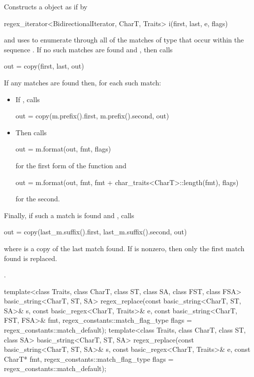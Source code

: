 \begin{itemdescr}
\pnum
{}%
%
\effects
Constructs a  object 
as if by
\begin{codeblock}
regex_iterator<BidirectionalIterator, CharT, Traits> i(first, last, e, flags)
\end{codeblock}
and uses  to enumerate through all
of the matches  of type 
that occur within the sequence .
If no such
matches are found and
, then calls
\begin{codeblock}
out = copy(first, last, out)
\end{codeblock}
If any matches are found then, for each such match:
\begin{itemize}
\item
If , calls
\begin{codeblock}
out = copy(m.prefix().first, m.prefix().second, out)
\end{codeblock}
\item
Then calls
\begin{codeblock}
out = m.format(out, fmt, flags)
\end{codeblock}
for the first form of the function and
\begin{codeblock}
out = m.format(out, fmt, fmt + char_traits<CharT>::length(fmt), flags)
\end{codeblock}
for the second.
\end{itemize}
Finally, if such a match
is found and ,
calls
\begin{codeblock}
out = copy(last_m.suffix().first, last_m.suffix().second, out)
\end{codeblock}
where  is a copy of the last match
found. If 
is nonzero, then only the first match found is replaced.

\pnum
\returns
{}.
\end{itemdescr}

%
\begin{itemdecl}
template<class Traits, class CharT, class ST, class SA, class FST, class FSA>
  basic_string<CharT, ST, SA>
    regex_replace(const basic_string<CharT, ST, SA>& s,
                  const basic_regex<CharT, Traits>& e,
                  const basic_string<CharT, FST, FSA>& fmt,
                  regex_constants::match_flag_type flags = regex_constants::match_default);
template<class Traits, class CharT, class ST, class SA>
  basic_string<CharT, ST, SA>
    regex_replace(const basic_string<CharT, ST, SA>& s,
                  const basic_regex<CharT, Traits>& e,
                  const CharT* fmt,
                  regex_constants::match_flag_type flags = regex_constants::match_default);
\end{itemdecl}

